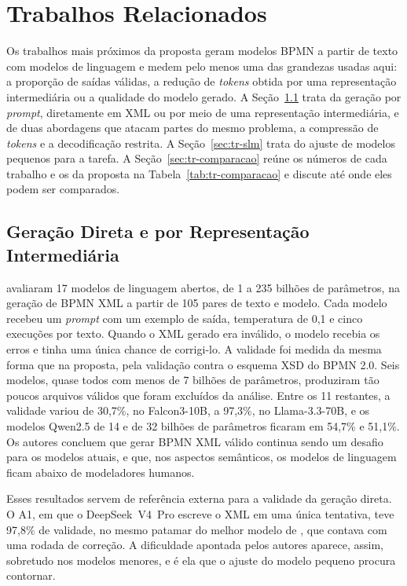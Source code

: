 
\chapter{Trabalhos Relacionados}
\label{cap:trabalhos-relacionados}

Os trabalhos mais próximos da proposta geram modelos BPMN a partir de texto com modelos de linguagem e medem pelo menos uma das grandezas usadas aqui: a proporção de saídas válidas, a redução de \textit{tokens} obtida por uma representação intermediária ou a qualidade do modelo gerado. A Seção~\ref{sec:tr-xml} trata da geração por \textit{prompt}, diretamente em XML ou por meio de uma representação intermediária, e de duas abordagens que atacam partes do mesmo problema, a compressão de \textit{tokens} e a decodificação restrita. A Seção~\ref{sec:tr-slm} trata do ajuste de modelos pequenos para a tarefa. A Seção~\ref{sec:tr-comparacao} reúne os números de cada trabalho e os da proposta na Tabela~\ref{tab:tr-comparacao} e discute até onde eles podem ser comparados.

\section{Geração Direta e por Representação Intermediária}
\label{sec:tr-xml}\label{sec:tr-representacoes}\label{sec:tr-compressao}

 avaliaram 17 modelos de linguagem abertos, de 1 a 235 bilhões de parâmetros, na geração de BPMN XML a partir de 105 pares de texto e modelo. Cada modelo recebeu um \textit{prompt} com um exemplo de saída, temperatura de 0,1 e cinco execuções por texto. Quando o XML gerado era inválido, o modelo recebia os erros e tinha uma única chance de corrigi-lo. A validade foi medida da mesma forma que na proposta, pela validação contra o esquema XSD do BPMN 2.0. Seis modelos, quase todos com menos de 7 bilhões de parâmetros, produziram tão poucos arquivos válidos que foram excluídos da análise. Entre os 11 restantes, a validade variou de 30,7\%, no Falcon3-10B, a 97,3\%, no Llama-3.3-70B, e os modelos Qwen2.5 de 14 e de 32 bilhões de parâmetros ficaram em 54,7\% e 51,1\%. Os autores concluem que gerar BPMN XML válido continua sendo um desafio para os modelos atuais, e que, nos aspectos semânticos, os modelos de linguagem ficam abaixo de modeladores humanos.

Esses resultados servem de referência externa para a validade da geração direta. O A1, em que o DeepSeek~V4~Pro escreve o XML em uma única tentativa, teve 97,8\% de validade, no mesmo patamar do melhor modelo de , que contava com uma rodada de correção. A dificuldade apontada pelos autores aparece, assim, sobretudo nos modelos menores, e é ela que o ajuste do modelo pequeno procura contornar.

